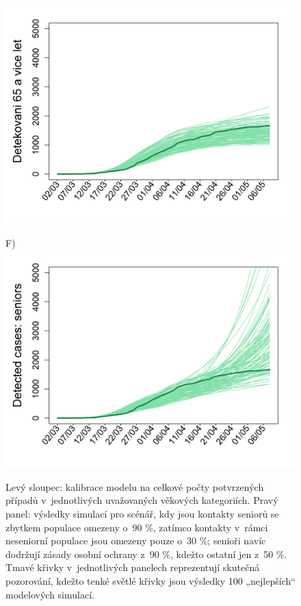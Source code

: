 \begin{figure}
\begin{center}
\begin{minipage}[m]{0.45\textwidth}
			\includegraphics[width = \textwidth]{pic/sc_bas_3.png}
		\end{minipage}
		\begin{minipage}[m]{0.45\textwidth}
			F) \\
			\includegraphics[width = \textwidth]{pic/sc_old90_30_3.png}
		\end{minipage}
	\end{center}
	\caption{Levý sloupec: kalibrace modelu na celkové počty potvrzených případů v~jednotlivých uvažovaných věkových kategoriích. Pravý panel: výsledky simulací pro scénář, kdy jsou kontakty seniorů se zbytkem populace omezeny o~90 \%, zatímco kontakty v~rámci neseniorní populace jsou omezeny pouze o~30 \%; senioři navíc dodržují zásady osobní ochrany z~90 \%, kdežto ostatní jen z~50 \%. Tmavé křivky v~jednotlivých panelech reprezentují skutečná pozorování, kdežto tenké světlé křivky jsou výsledky 100 „nejlepších“ modelových simulací.}
	\label{shelterning_seniors}
\end{figure}

